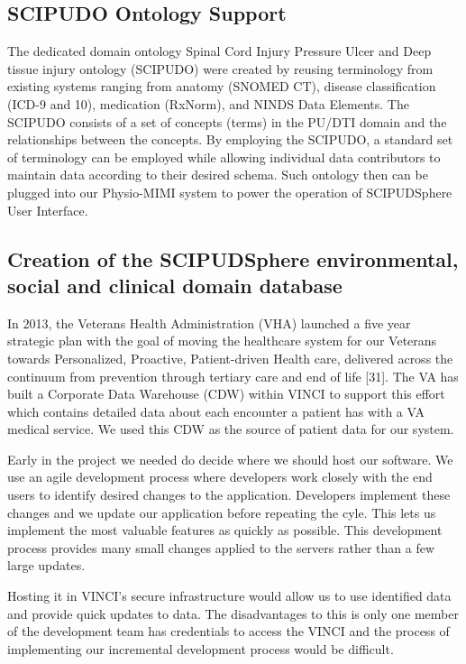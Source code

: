 \documentclass{amia}
\begin{document}

\subsection{SCIPUDO Ontology Support}
The dedicated domain ontology Spinal Cord Injury Pressure Ulcer and Deep tissue injury ontology (SCIPUDO) were created by reusing terminology from existing systems ranging from anatomy (SNOMED CT), disease classification (ICD-9 and 10), medication (RxNorm), and NINDS Data Elements. The SCIPUDO consists of a set of concepts (terms) in the PU/DTI domain and the relationships between the concepts. By employing the SCIPUDO, a standard set of terminology can be employed while allowing individual data contributors to maintain data according to their desired schema. Such ontology then can be plugged into our Physio-MIMI system to power the operation of SCIPUDSphere User Interface.

\subsection{Creation of the SCIPUDSphere environmental, social and clinical domain database}

In 2013, the Veterans Health Administration (VHA) launched a five year strategic plan with the goal of moving the healthcare system for our Veterans towards Personalized, Proactive, Patient-driven Health care, delivered across the continuum from prevention through tertiary care and end of life [31].  The VA has built a Corporate Data Warehouse (CDW) within VINCI to support this effort which contains detailed data about each encounter a patient has with a VA medical service.  We used this CDW as the source of patient data for our system.

Early in the project we needed do decide where we should host our software.  We use an agile development process where developers work closely with the end users to identify desired changes to the application.  Developers implement these changes and we update our application before repeating the cyle.  This lets us implement the most valuable features as quickly as possible.  This development process provides many small changes applied to the servers rather than a few large updates.

Hosting it in VINCI's secure infrastructure would allow us to use identified data and provide quick updates to data. The disadvantages to this is only one member of the development team has credentials to access the VINCI and the process of implementing our incremental development process would be difficult.
\end{document}
